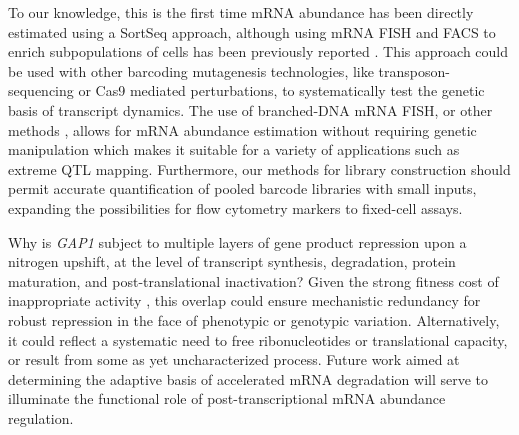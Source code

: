 To our knowledge, this is the first time mRNA abundance has
been directly estimated using a SortSeq approach, although 
using mRNA FISH and FACS to enrich subpopulations of cells has been
previously reported
\parencite{klemm2014transcriptional,hanley2013detection,sliva2016barcode}. This
approach could be used with other barcoding mutagenesis technologies,
like transposon-sequencing or Cas9 mediated perturbations, to
systematically test the genetic basis of transcript dynamics.
The use of branched-DNA mRNA FISH, or other methods
\parencite{rouhanifard2017single}, allows for mRNA abundance estimation without
requiring genetic manipulation which makes it suitable for a variety
of applications such as extreme QTL mapping. 
Furthermore, our methods for library construction should permit accurate
quantification of pooled barcode libraries with small inputs, 
expanding the possibilities for flow cytometry markers to fixed-cell assays.

Why is \textit{GAP1} subject to multiple layers of gene product repression upon
a nitrogen upshift, at the level of transcript synthesis, degradation,
protein maturation, and post-translational inactivation? Given the
strong fitness cost of inappropriate activity
\parencite{risinger2006activity},
this overlap could ensure mechanistic redundancy for robust repression in
the face of phenotypic or genotypic variation. Alternatively, it could
reflect a systematic need to free ribonucleotides or
translational capacity, or result from some as yet uncharacterized
process.
Future work aimed at determining the adaptive basis of accelerated
mRNA degradation will serve to illuminate the functional role of
post-transcriptional mRNA abundance regulation.

